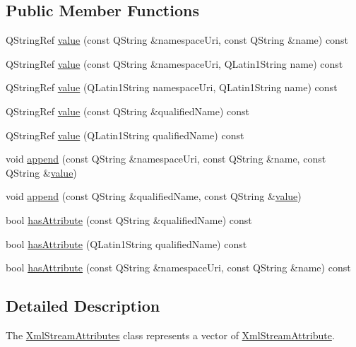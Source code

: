 \subsection*{Public Member Functions}
\begin{DoxyCompactItemize}
\item 
Q\+String\+Ref \hyperlink{class_xml_stream_attributes_ac13c28528742b32ef4c4684f8c39941b}{value} (const Q\+String \&namespace\+Uri, const Q\+String \&name) const
\item 
Q\+String\+Ref \hyperlink{class_xml_stream_attributes_a6b298362365a1199b9287dbbcbcf39c0}{value} (const Q\+String \&namespace\+Uri, Q\+Latin1\+String name) const
\item 
Q\+String\+Ref \hyperlink{class_xml_stream_attributes_ac782842988173fa01be24dd38c7c4605}{value} (Q\+Latin1\+String namespace\+Uri, Q\+Latin1\+String name) const
\item 
Q\+String\+Ref \hyperlink{class_xml_stream_attributes_adeb02e3a2e49bbf7a32066fe6780016b}{value} (const Q\+String \&qualified\+Name) const
\item 
Q\+String\+Ref \hyperlink{class_xml_stream_attributes_ac783484006b66fe5c4af1c0f6aba1976}{value} (Q\+Latin1\+String qualified\+Name) const
\item 
void \hyperlink{class_xml_stream_attributes_a51a667e3daddcea19ec85d51f0da6d6b}{append} (const Q\+String \&namespace\+Uri, const Q\+String \&name, const Q\+String \&\hyperlink{class_xml_stream_attributes_ac13c28528742b32ef4c4684f8c39941b}{value})
\item 
void \hyperlink{class_xml_stream_attributes_a062ae122b7c39f5993cfcf0cd30a4942}{append} (const Q\+String \&qualified\+Name, const Q\+String \&\hyperlink{class_xml_stream_attributes_ac13c28528742b32ef4c4684f8c39941b}{value})
\item 
bool \hyperlink{class_xml_stream_attributes_a19c0aee6f2a399a8b830441260d46b84}{has\+Attribute} (const Q\+String \&qualified\+Name) const
\item 
bool \hyperlink{class_xml_stream_attributes_a78238cc4e8a5e44594cb78d048e18500}{has\+Attribute} (Q\+Latin1\+String qualified\+Name) const
\item 
bool \hyperlink{class_xml_stream_attributes_a86109339929f05fa1b8755f482fd19d9}{has\+Attribute} (const Q\+String \&namespace\+Uri, const Q\+String \&name) const
\end{DoxyCompactItemize}


\subsection{Detailed Description}
The \hyperlink{class_xml_stream_attributes}{Xml\+Stream\+Attributes} class represents a vector of \hyperlink{class_xml_stream_attribute}{Xml\+Stream\+Attribute}. 

